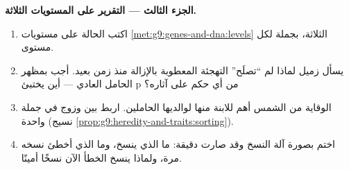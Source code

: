 \begin{problem}
\medskip\noindent\textbf{الجزء الثالث --- التقرير على
المستويات الثلاثة.}
\begin{enumerate}[resume]
  \item اكتب الحالة على مستويات
        \cref{met:g9:genes-and-dna:levels} الثلاثة،
        بجملة لكل مستوى.
  \item يسأل زميل لماذا لم ``تصلَح'' التهجئة المعطوبة
        بالإزالة منذ زمن بعيد. أجب بمظهر الحامل العادي
        --- أين يختبئ p من أي حكم على آثاره؟
  \item الوقاية من الشمس أهم للابنة منها لوالديها
        الحاملين. اربط بين  وزوج  
        في جملة واحدة (نسيج
        \cref{prop:g9:heredity-and-traits:sorting}).
  \item اختم بصورة آلة النسخ وقد صارت دقيقة: ما الذي
        ينسخ، وما الذي أخطئ نسخه مرة، ولماذا ينسخ الخطأ
        الآن نسخًا أمينًا.
\end{enumerate}
\end{problem}
